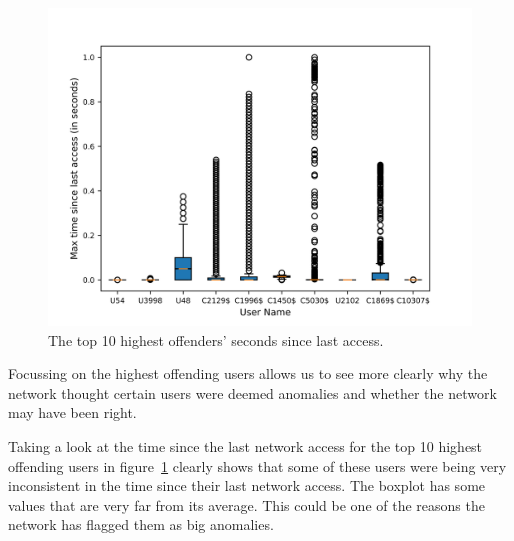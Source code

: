 \begin{figure}
	\begin{center}
		\includegraphics[scale=0.1]{evaluation/highest_offender_time_since_last_access}
	\end{center}
	\caption{The top 10 highest offenders' seconds since last access.~\label{fig:time_since_last_access}}
\end{figure}

Focussing on the highest offending users allows us to see more clearly why the network thought certain users were deemed anomalies and whether the network may have been right.

Taking a look at the time since the last network access for the top 10 highest offending users in figure~\ref{fig:time_since_last_access} clearly shows that some of these users were being very inconsistent in the time since their last network access. The boxplot has some values that are very far from its average. This could be one of the reasons the network has flagged them as big anomalies.


